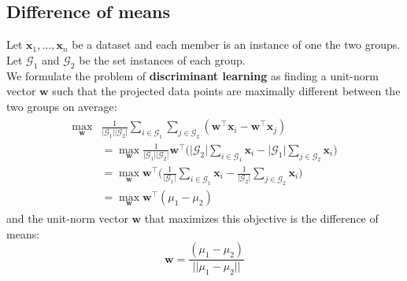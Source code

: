 \subsection{Difference of means}
Let $\mathbf{x}_1, \ldots, \mathbf{x}_n$ be a dataset and each member is an instance of one the two groups. Let $\mathcal{G}_1$ and $\mathcal{G}_2$ be the set instances of each group.\\
We formulate the problem of \textbf{discriminant learning} as finding a unit-norm vector $\mathbf{w}$ such that the projected data points are maximally different between the two groups on average:
\begin{align}
	\begin{split}
		\max_{\mathbf{w}} &\frac{1}{\lvert \mathcal{G}_1\rvert \lvert \mathcal{G}_2 \rvert} \sum_{i \in \mathcal{G}_1} \sum_{j \in \mathcal{G}_2} (\mathbf{w}^\top \mathbf{x}_i- \mathbf{w}^\top\mathbf{x}_j) \\
		& = \max_{\mathbf{w}} \frac{1}{\lvert \mathcal{G}_1\rvert \lvert \mathcal{G}_2 \rvert} \mathbf{w}^\top \bigg(\lvert \mathcal{G}_2\rvert\sum_{i \in \mathcal{G}_1} \mathbf{x}_i - \lvert \mathcal{G}_1 \rvert \sum_{j \in \mathcal{G}_2} \mathbf{x}_i\bigg) \\
		& = \max_{\mathbf{w}} \mathbf{w}^\top \bigg(\frac{1}{\lvert \mathcal{G}_1\rvert}\sum_{i \in \mathcal{G}_1} \mathbf{x}_i - \frac{1}{\lvert \mathcal{G}_2 \rvert }\sum_{j \in \mathcal{G}_2} \mathbf{x}_i\bigg) \\
		& = \max_{\mathbf{w}} \mathbf{w}^\top (\mu_1 - \mu_2)
	\end{split}
\end{align}
and the unit-norm vector $\mathbf{w}$ that maximizes this objective is the difference of means:
\begin{equation}
	\mathbf{w} = \frac{(\mu_1 -\mu_2)}{\lvert\lvert \mu_1-\mu_2\rvert\rvert}
\end{equation}
